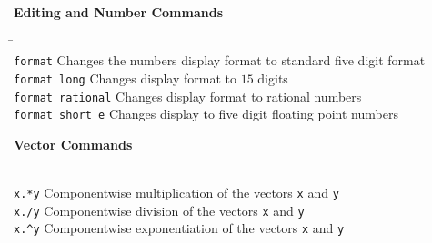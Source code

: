\documentclass{ximera}
\begin{document}
\centerline{
{\bf Editing and Number Commands}
} \vspace*{-0.1in}

\begin{tabbing}
 \hspace{1.1in} \=  \hspace{1.3in} \= \\
	{\tt format}   \>
 Changes the numbers display format  
			to standard five digit format   \\
\> 	{\tt format long}   \>
 Changes display format to $15$ digits \\
\>	{\tt format rational}   \>
 Changes display format to rational numbers \\
\> {\tt format short e}  \>
 Changes display to five digit floating point numbers  
\end{tabbing}

\centerline{
{\bf Vector Commands}
} \vspace*{-0.11in}
\begin{tabbing}
 \hspace{1.3in} \= \\
{\tt x.*y} \>
Componentwise multiplication of the vectors {\tt x} and {\tt y}\\
{\tt x./y} \>
Componentwise division of the vectors {\tt x} and {\tt y}\\
{\tt x.\^{}y} \>
Componentwise exponentiation of the vectors {\tt x} and {\tt y}
\end{tabbing}
 
\end{document}
